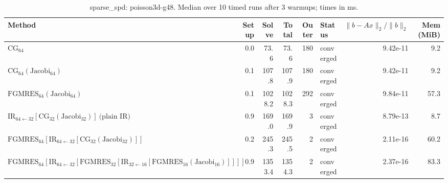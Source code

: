 \begin{table}[t]
\centering
\small
\caption{sparse_spd: poisson3d-g48. Median over 10 timed runs after 3 warmups; times in ms.}
\label{tab:sparse_spd-poisson3d-g48}
\begin{tabular}{lrrrrlrr}
\hline
Method & Setup & Solve & Total & Outer & Status & $\|b-Ax\|_2/\|b\|_2$ & Mem (MiB) \\
\hline
$\mathrm{CG}_{64}$ & 0.0 & 73.6 & 73.6 & 180 & converged & 9.42e-11 & 9.2 \\
$\mathrm{CG}_{64}(\mathrm{Jacobi}_{64})$ & 0.1 & 107.8 & 107.9 & 180 & converged & 9.42e-11 & 9.2 \\
$\mathrm{FGMRES}_{64}(\mathrm{Jacobi}_{64})$ & 0.1 & 1028.2 & 1028.3 & 292 & converged & 9.84e-11 & 57.3 \\
$\mathrm{IR}_{64\leftarrow 32}[\mathrm{CG}_{32}(\mathrm{Jacobi}_{32})]\ \text{(plain IR)}$ & 0.9 & 169.0 & 169.9 & 3 & converged & 8.79e-13 & 8.7 \\
$\mathrm{FGMRES}_{64}[\mathrm{IR}_{64\leftarrow 32}[\mathrm{CG}_{32}(\mathrm{Jacobi}_{32})]]$ & 0.2 & 245.3 & 245.5 & 2 & converged & 2.11e-16 & 60.2 \\
$\mathrm{FGMRES}_{64}[\mathrm{IR}_{64\leftarrow 32}[\mathrm{FGMRES}_{32}[\mathrm{IR}_{32\leftarrow 16}[\mathrm{FGMRES}_{16}(\mathrm{Jacobi}_{16})]]]]$ & 0.9 & 1353.4 & 1354.3 & 2 & converged & 2.37e-16 & 83.3 \\
\hline
\end{tabular}
\end{table}
